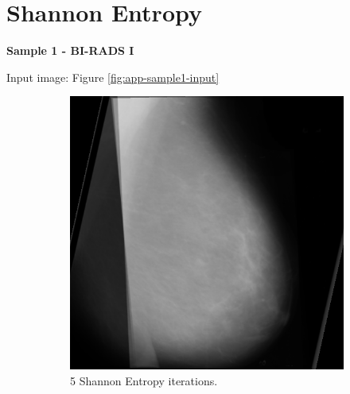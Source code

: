 \newpage
\section{Shannon Entropy}
\label{sec:app-shannon}

\noindent \textbf{Sample 1 - BI-RADS I}

Input image: Figure \ref{fig:app-sample1-input}

\begin{figure}[H]
    \centering
    \begin{subfigure}[t]{0.3\textwidth}
        \includegraphics[width=\textwidth]{Appendix5/sample1/shannon/s-5-final.png}
        \caption{5 Shannon Entropy iterations.}
        \label{fig:app-5-shannon-sample1}
    \end{subfigure} \hfill
    ~ %
    \begin{subfigure}[t]{0.3\textwidth}

\end{subfigure}
\end{figure}
